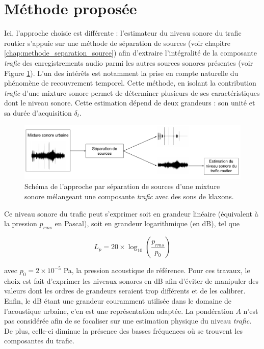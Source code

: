 \section{Méthode proposée}\label{sect:methode}

Ici, l'approche choisie est différente : l'estimateur du niveau sonore du trafic routier s'appuie sur une méthode de séparation de sources (voir chapitre \ref{chap:methode_separation_source}) afin d'extraire l'intégralité de la composante \textit{trafic} des enregistrements audio parmi les autres sources sonores présentes (voir Figure \ref{fig:separation_source}). L'un des intérêts est notamment la prise en compte naturelle du phénomène de recouvrement temporel. 
Cette méthode, en isolant la contribution \textit{trafic} d'une mixture sonore permet de déterminer plusieurs de ses caractéristiques dont le niveau sonore. Cette estimation dépend de deux grandeurs : son unité et sa durée d'acquisition $\delta_t$.

\begin{figure}[ht]
\centering
\includegraphics[width=0.9\linewidth]{./figures/autres/schema_source_separation_FR.pdf}
\caption{Schéma de l'approche par séparation de sources d'une mixture sonore mélangeant une composante \textit{trafic} avec des sons de klaxons.}
\label{fig:separation_source}
\end{figure}

Ce niveau sonore du trafic peut s'exprimer soit en grandeur linéaire (équivalent à la pression $p_{rms}$ en Pascal), soit en grandeur logarithmique (en dB), tel que

\begin{equation}\label{eq:Lp}
L_{p} = 20 \times \log_{10} \left( \frac{p_{rms}}{p_0} \right)
\end{equation}

avec $p_0 = 2\times 10^{-5}$ Pa, la pression acoustique de référence. Pour ces travaux, le choix est fait d'exprimer les niveaux sonores en dB afin d'éviter de manipuler des valeurs dont les ordres de grandeurs seraient trop différents et de les calibrer. Enfin, le dB étant une grandeur couramment utilisée dans le domaine de l'acoustique urbaine, c'en est une représentation adaptée. La pondération $A$ n'est pas considérée afin de se focaliser sur une estimation physique du niveau \textit{trafic}. De plus, celle-ci diminue la présence des basses fréquences où se trouvent les composantes du trafic. 

